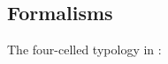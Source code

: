 	\subsection{Formalisms}
\ex\label{typo-layer}The four-celled typology in \citet[109]{layering15}:\\
%


